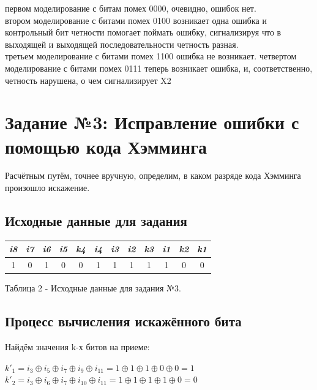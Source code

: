 \documentclass[14pt]{article}
\begin{document}
 первом моделирование с битам помех 0000, очевидно, ошибок нет.\\
 втором моделирование с битами помех 0100 возникает одна ошибка и контрольный бит четности помогает поймать ошибку, сигнализируя что в выходящей и выходящей последовательности четность разная.\\
 третьем моделирование с битами помех 1100 ошибка не возникает.
 четвертом моделирование с битами помех 0111 теперь возникает ошибка, и, соответственно, четность нарушена, о чем сигнализирует X2
\section{Задание №3: Исправление ошибки с помощью кода Хэмминга}
Расчётным путём, точнее вручную, определим, в каком разряде кода Хэмминга произошло искажение. 
\subsection{Исходные данные для задания}
\begin{center}
\begin{table}[h]
\begin{tabular}{|c|c|c|c|c|c|c|c|c|c|c|c|}
\hline
\textit{i8} & \textit{i7} & \textit{i6} & \textit{i5} & \textit{k4} & \textit{i4} & \textit{i3} & \textit{i2} & \textit{k3} & \textit{i1} & \textit{k2} & \textit{k1} \\ \hline
1           & 0           & 1           & 0           & 0           & 1           & 1           & 1           & 1           & 1           & 0           & 0           \\ \hline
\end{tabular}
\end{table}
        Таблица 2 - Исходные данные для задания №3.
\end{center}

\subsection{Процесс вычисления искажённого бита}
Найдём значения k-х битов на приеме:

$k'_1 = i_3 \oplus i_5 \oplus i_7 \oplus i_9 \oplus i_{11} = 1 \oplus 1 \oplus 1 \oplus 0 \oplus 0 = 1$ \\

$k'_2 = i_3 \oplus i_6 \oplus i_7 \oplus i_{10} \oplus i_{11} = 1 \oplus 1 \oplus 1 \oplus 1 \oplus 0 = 0$ \\
\end{document}
